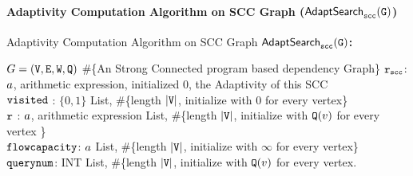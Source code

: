    \paragraph*{Adaptivity Computation Algorithm on SCC Graph ($\mathtt{\mathsf{AdaptSearch}_{scc}(G)}$)}
     \begin{algorithm}
             \caption{
             {Adaptivity Computation Algorithm on SCC Graph  {\bf {$\mathtt{\mathsf{AdaptSearch}_{scc}(G)}$}:} }
             \label{alg:adaptscc}
             }
             \begin{algorithmic}[1]
               \REQUIRE $G = (\mathtt{V}, \mathtt{E}, \mathtt{W}, \mathtt{Q})$ \#\{An Strong Connected program based dependency Graph\}
             $\mathtt{r_{scc}}$: $a$, arithmetic expression, initialized $0$, the Adaptivity of this SCC
             \\ \qquad  $\mathtt{visited}$ : $\{0, 1\}$ List,  \#\{length $|\mathtt{V}|$, initialize with $0$ for every vertex\}
             \\ \qquad  $\mathtt{r}$ : $a$, arithmetic expression List, 
             \#\{length $|\mathtt{V}|$, initialize with $\mathtt{Q}(v)$ for every vertex \}
             \\ \qquad  $\mathtt{flowcapacity}$: $a$ List, 
             \#\{length $|\mathtt{V}|$, initialize with $\infty$ for every vertex\}
             \\ \qquad  $\mathtt{querynum}$: INT List,  \#\{length $|\mathtt{V}|$, initialize with $\mathtt{Q}(v)$ for every vertex.

\end{algorithmic}
\end{algorithm}
